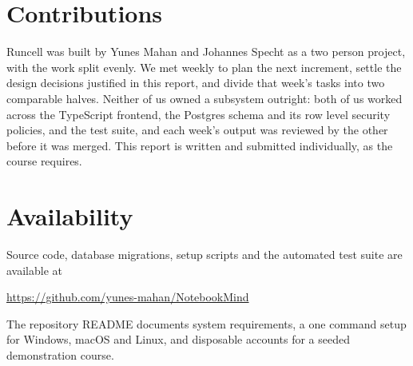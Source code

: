 \documentclass[manuscript]{acmart}
\begin{document}
\section*{Contributions}

Runcell was built by Yunes Mahan and Johannes Specht as a two person project,
with the work split evenly. We met weekly to plan the next increment, settle
the design decisions justified in this report, and divide that week's tasks
into two comparable halves. Neither of us owned a subsystem outright: both of
us worked across the TypeScript frontend, the Postgres schema and its row level
security policies, and the test suite, and each week's output was reviewed by
the other before it was merged. This report is written and submitted
individually, as the course requires.

\section*{Availability}

Source code, database migrations, setup scripts and the automated test suite
are available at

\begin{center}
\url{https://github.com/yunes-mahan/NotebookMind}
\end{center}

\noindent
The repository README documents system requirements, a one command setup for
Windows, macOS and Linux, and disposable accounts for a seeded demonstration
course.



\end{document}
